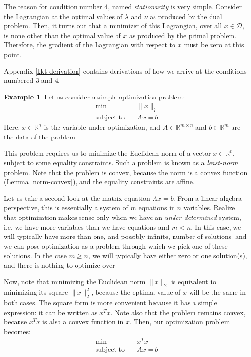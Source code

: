 \documentclass[a4paper]{article}
\theoremstyle{definition}
\newtheorem{example}{Example}[subsection]
\begin{document}
The reason for condition number 4, named \textit{stationarity} is very simple.
Consider the Lagrangian at the optimal values of $\lambda$ and $\nu$ as produced by the dual problem.
Then, it turns out that a minimizer of this Lagrangian, over all $x \in \mathcal{D}$, is none other than the optimal value of $x$ as produced by the primal problem.
Therefore, the gradient of the Lagrangian with respect to $x$ must be zero at this point.

Appendix \ref{kkt-derivation} contains derivations of how we arrive at the conditions numbered 3 and 4.

\begin{example}
	Let us consider a simple optimization problem:
	\begin{align*}
		\min \quad & \| x \|_2 \\
		\text{subject to} \quad & Ax = b
	\end{align*}
	Here, $x \in \mathbb{R}^n$ is the variable under optimization, and $A \in \mathbb{R}^{m \times n}$ and $b \in \mathbb{R}^m$ are the data of the problem.

	This problem requires us to minimize the Euclidean norm of a vector $x \in \mathbb{R}^n$, subject to some equality constraints.
	Such a problem is known as a \textit{least-norm} problem.
	Note that the problem is convex, because the norm is a convex function (Lemma \ref{norm-convex}), and the equality constraints are affine.

	Let us take a second look at the matrix equation $Ax = b$.
	From a linear algebra perspective, this is essentially a system of $m$ equations in $n$ variables.
	Realize that optimization makes sense only when we have an \textit{under-determined} system, i.e. we have more variables than we have equations and $m < n$.
	In this case, we will typically have more than one, and possibly infinite, number of solutions, and we can pose optimization as a problem through which we pick one of these solutions.
	In the case $m \geq n$, we will typically have either zero or one solution(s), and there is nothing to optimize over.

	Now, note that minimizing the Euclidean norm $\| x \|_2$ is equivalent to minimizing its square $\| x \|_2^2$, because the optimal value of $x$ will be the same in both cases.
	The square form is more convenient because it has a simple expression: it can be written as $x^T x$.
	Note also that the problem remains convex, because $x^T x$ is also a convex function in $x$.
	Then, our optimization problem becomes:
	\begin{align*}
		\min \quad & x^T x \\
		\text{subject to} \quad & Ax = b
	\end{align*}


\end{example}
\end{document}
